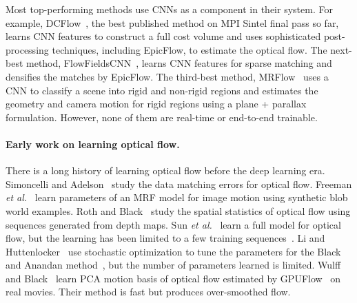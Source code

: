 \documentclass[10pt,journal,cspaper,compsoc]{IEEEtran}
\def\etal{\emph{et al.}\xspace}
\newcommand{\beforePara}{\vspace{-0em}}
\begin{document}
	Most top-performing methods use CNNs as a component in their system. For example, DCFlow~\cite{Xu2017Accurate},  the best published method on MPI Sintel final pass so far, learns CNN features to construct a full cost volume and uses sophisticated post-processing techniques, including EpicFlow, to estimate the optical flow. The next-best method, FlowFieldsCNN~\cite{Bailer_2017_CVPR}, learns CNN features for sparse matching and densifies the matches by EpicFlow. 
	The third-best method, MRFlow~\cite{Wulff2017Optical} uses a CNN to classify a scene into rigid and non-rigid regions and estimates the geometry and camera motion for rigid regions using a plane + parallax formulation. However, none of them are real-time or end-to-end trainable.

	
	\beforePara
	\paragraph{Early work on learning optical flow.}
	There is a long history of learning optical flow before the deep learning era.
	Simoncelli and Adelson~\cite{Simoncelli:1991:Probability} study the data matching errors for optical flow.
	Freeman \etal~\cite{Freeman:2000:LLLV} learn parameters of an MRF model for image motion using synthetic blob world examples.
	Roth and Black~\cite{Roth:2007:SSO} study the spatial statistics of optical flow using sequences generated from depth maps. 
	Sun \etal~\cite{Sun:2008:LOF} learn a full model for optical flow, but the learning has been limited to a few training sequences~\cite{Baker:2011:DEO}. 
	Li and Huttenlocker~\cite{Li2008Learning} use stochastic optimization to tune the parameters for the Black and Anandan method~\cite{Black:1996:REMO}, but the number of parameters learned is limited. Wulff and Black~\cite{Wulff:2015:PCA} learn PCA motion basis of optical flow estimated by GPUFlow~\cite{Werlberger:2009:AHOF} on real movies. Their method is fast but produces over-smoothed flow.
	
	\beforePara
\end{document}
